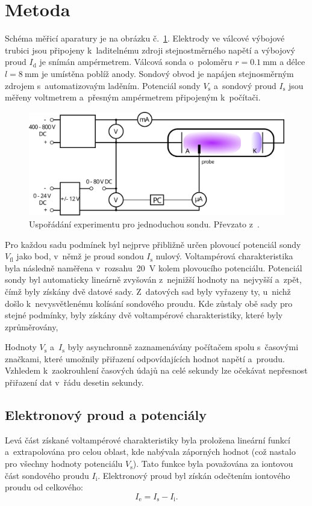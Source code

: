 \documentclass{protokol}
\newcommand\idisch{I_\mathrm{d}}
\newcommand\iprobe{I_\mathrm{s}}
\newcommand\iion{I_\mathrm{i}}
\newcommand\ielec{I_\mathrm{e}}
\newcommand\flpot{V_\mathrm{fl}}
\newcommand\potprobe{V_\mathrm{s}}
\begin{document}
\section{Metoda}
Schéma měřicí aparatury je na obrázku č.~\ref{fig:diagram-simple}.
Elektrody ve válcové výbojové trubici jsou připojeny k~laditelnému zdroji
stejnostměrného napětí a výbojový proud $\idisch$ je snímán ampérmetrem.
Válcová sonda o~poloměru $r=\SI{0.1}{\milli\metre}$
a délce $l=\SI{8}{\milli\metre}$ je umístěna poblíž anody.
Sondový obvod je napájen stejnosměrným zdrojem s~automatizovaým laděním.
Potenciál sondy $\potprobe$ a~sondový proud $\iprobe$ jsou měřeny
voltmetrem a~přesným ampérmetrem připojeným k~počítači.

\begin{figure}[hbp]
	\centering
	\includegraphics{diagram-simple.png}
	\caption{Uspořádání experimentu pro jednoduchou sondu.
		Převzato z~\autocite{assignment-simpleprobe}.}
	\label{fig:diagram-simple}
\end{figure}

Pro každou sadu podmínek byl nejprve přibližně určen plovoucí potenciál sondy
$\flpot$ jako bod, v~němž je proud sondou $\iprobe$ nulový.
Voltampérová charakteristika byla následně naměřena v~rozsahu~\SI{20}{\volt}
kolem plovoucího potenciálu.
Potenciál sondy byl automaticky lineárně zvyšován z~nejnižší hodnoty
na~nejvyšší a~zpět, čímž byly získány dvě datové sady.
Z~datových sad byly vyřazeny ty, u~nichž došlo k~nevysvětlenému kolísání
sondového proudu.
Kde zůstaly obě sady pro stejné podmínky, byly získány dvě voltampérové
charakteristiky, které byly zprůměrovány,

Hodnoty $\potprobe$ a~$\iprobe$ byly asynchronně zaznamenávány počítačem
spolu s~časovými značkami, které umožnily přiřazení odpovídajících hodnot
napětí a~proudu.
Vzhledem k~zaokrouhlení časových údajů na celé sekundy lze očekávat
nepřesnost přiřazení dat v~řádu desetin sekundy.

\subsection{Elektronový proud a potenciály}
Levá část získané voltampérové charakteristiky byla proložena lineární funkcí
a~extrapolována pro celou oblast, kde nabývala záporných hodnot
(což nastalo pro všechny hodnoty potenciálu $\potprobe$).
Tato funkce byla považována za iontovou část sondového proudu $\iion$.
Elektronový proud byl získán odečtením iontového proudu od celkového:
\begin{equation}
	\label{eq:ielec}
	\ielec = \iprobe - \iion.
\end{equation}
\end{document}
